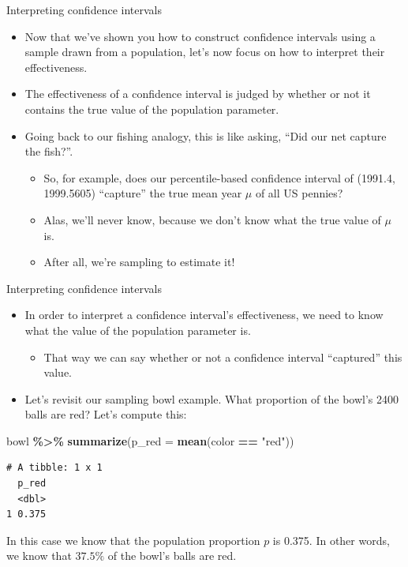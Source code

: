 \documentclass[
  ignorenonframetext,
]{beamer}
\newenvironment{Shaded}{\begin{snugshade}}{\end{snugshade}}
\newcommand{\AttributeTok}[1]{\textcolor[rgb]{0.13,0.29,0.53}{#1}}
\newcommand{\FunctionTok}[1]{\textcolor[rgb]{0.13,0.29,0.53}{\textbf{#1}}}
\newcommand{\NormalTok}[1]{#1}
\newcommand{\SpecialCharTok}[1]{\textcolor[rgb]{0.81,0.36,0.00}{\textbf{#1}}}
\newcommand{\StringTok}[1]{\textcolor[rgb]{0.31,0.60,0.02}{#1}}
\providecommand{\tightlist}{%
  \setlength{\itemsep}{0pt}\setlength{\parskip}{0pt}}
\begin{document}
\begin{frame}{Interpreting confidence intervals}
\label{interpreting-confidence-intervals-1}
\begin{itemize}
\item
  Now that we've shown you how to construct confidence intervals using a
  sample drawn from a population, let's now focus on how to interpret
  their effectiveness.
\item
  The effectiveness of a confidence interval is judged by whether or not
  it contains the true value of the population parameter.
\item
  Going back to our fishing analogy, this is like asking, ``Did our net
  capture the fish?''.

  \begin{itemize}
  \tightlist
  \item
    So, for example, does our percentile-based confidence interval of
    (1991.4, 1999.5605) ``capture'' the true mean year \(\mu\) of all US
    pennies?
  \item
    Alas, we'll never know, because we don't know what the true value of
    \(\mu\) is.
  \item
    After all, we're sampling to estimate it!
  \end{itemize}
\end{itemize}
\end{frame}

\begin{frame}[fragile]{Interpreting confidence intervals}
\label{interpreting-confidence-intervals-2}
\begin{itemize}
\item
  In order to interpret a confidence interval's effectiveness, we need
  to know what the value of the population parameter is.

  \begin{itemize}
  \tightlist
  \item
    That way we can say whether or not a confidence interval
    ``captured'' this value.
  \end{itemize}
\item
  Let's revisit our sampling bowl example. What proportion of the bowl's
  2400 balls are red? Let's compute this:
\end{itemize}

\begin{Shaded}
\begin{Highlighting}[]
\NormalTok{bowl }\SpecialCharTok{\%\textgreater{}\%} \FunctionTok{summarize}\NormalTok{(}\AttributeTok{p\_red =} \FunctionTok{mean}\NormalTok{(color }\SpecialCharTok{==} \StringTok{"red"}\NormalTok{))}
\end{Highlighting}
\end{Shaded}

\begin{verbatim}
# A tibble: 1 x 1
  p_red
  <dbl>
1 0.375
\end{verbatim}

In this case we know that the population proportion \(p\) is 0.375. In
other words, we know that \(37.5\%\) of the bowl's balls are red.
\end{frame}
\end{document}
